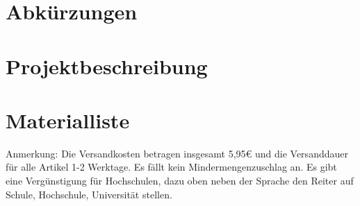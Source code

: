 \documentclass[12pt,a4paper,openany]{scrbook}
\begin{document}
 
 
\newpage


\tableofcontents
\newpage


 
\printnomenclature

\listoffigures
\newpage

\listoftables
\newpage

\chapter*{Abkürzungen}
 
\begin{acronym}
 
     
\end{acronym}
\newpage
 

\chapter{Projektbeschreibung}
\newpage




\chapter{Materialliste}
Anmerkung: Die Versandkosten betragen insgesamt 5,95€ und die Versanddauer für alle Artikel 1-2 Werktage. Es fällt kein Mindermengenzuschlag an. Es gibt eine Vergünstigung für Hochschulen, dazu oben neben der Sprache den Reiter auf Schule, Hochschule, Universität stellen.\cite{asd}
\end{document}
